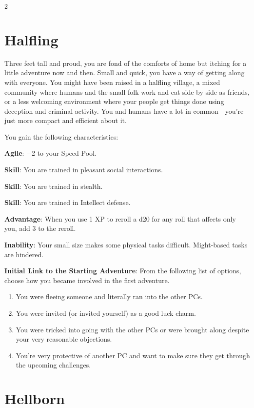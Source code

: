 \begin{multicols}{2}
\section{Halfling}

Three feet tall and proud, you are fond of the comforts of home but itching for a little adventure now and then. Small and quick, you have a way of getting along with everyone. You might have been raised in a halfling village, a mixed community where humans and the small folk work and eat side by side as friends, or a less welcoming environment where your people get things done using deception and criminal activity. You and humans have a lot in common—you’re just more compact and efficient about it. 

You gain the following characteristics: 

\textbf{Agile}: +2 to your Speed Pool. 

\textbf{Skill}: You are trained in pleasant social interactions. 

\textbf{Skill}: You are trained in stealth. 

\textbf{Skill}: You are trained in Intellect defense. 

\textbf{Advantage}: When you use 1 XP to reroll a d20 for any roll that affects only you, add 3 to the reroll. 

\textbf{Inability}: Your small size makes some physical tasks difficult. Might-based tasks are hindered. 

\textbf{Initial Link to the Starting Adventure}: From the following list of options, choose how you became involved in the first adventure. 

\begin{enumerate} 
\item You were fleeing someone and literally ran into the other PCs. 
\item You were invited (or invited yourself) as a good luck charm. 
\item You were tricked into going with the other PCs or were brought along despite your very reasonable objections. 
\item You’re very protective of another PC and want to make sure they get through the upcoming challenges.
\end{enumerate}

\section{Hellborn}


\end{multicols}
